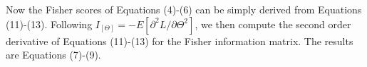 \documentclass[journal]{IEEEtran}
\begin{document}
Now the Fisher scores of Equations (4)-(6) can be simply derived from Equations (11)-(13). Following ${I_{[\Theta ]}} =  - E[ {{\partial ^2}L}/{\partial {\Theta ^2}}]$, we then compute the second order derivative of Equations (11)-(13) for the Fisher information matrix. The results are Equations (7)-(9).

%
%
%
%
\ifCLASSOPTIONcaptionsoff
  \newpage
\fi
\end{document}
